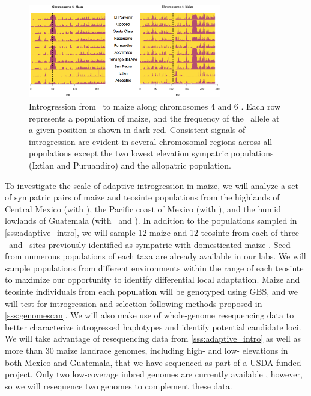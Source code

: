 \begin{figure}[t]
  \centering
   \includegraphics[width=0.75\textwidth]{same_regions}
    \caption{ Introgression from \zm\ to maize along chromosomes 4 and 6 \citep{Hufford2013}. Each row represents a population of maize, and the frequency of the \zm\ allele at a given position is shown in dark red. Consistent signals of introgression are evident in several chromosomal regions across all populations except the two lowest elevation sympatric populations (Ixtlan and Puruandiro) and the allopatric population.}
\label{fig:sameregions}
\end{figure} 

To investigate the scale of adaptive introgression in maize, we will analyze a set of sympatric pairs of maize and teosinte populations from the highlands of Central Mexico (with \zm), the Pacific coast of Mexico (with \zp), and the humid lowlands of Guatemala (with \zl\ and \zh). 
In addition to the populations sampled in \ref{sss:adaptive_intro}, we will sample 12 maize and 12 teosinte from each of three \zm\ and \zp\ sites previously identified as sympatric with domesticated maize \citep{hufford2010genetic, Hufford2013}.  
Seed from numerous populations of each taxa are already available in our labs.
We will sample populations from different environments within the range of each teosinte to maximize our opportunity to identify differential local adaptation.
Maize and teosinte individuals from each population will be genotyped using GBS, and we will test for introgression and selection following methods proposed in \ref{sss:genomescan}.
We will also make use of whole-genome resequencing data to better characterize introgressed haplotypes and identify potential candidate loci. 
We will take advantage of resequencing data from \ref{sss:adaptive_intro} as well as more than 30 maize landrace genomes, including high- and low- elevations in both Mexico and Guatemala, that we have sequenced as part of a USDA-funded project.  
Only two low-coverage inbred \zm{} genomes are currently available \citep{Chia2012a}, however, so we will resequence two \zm{} genomes to complement these data.

